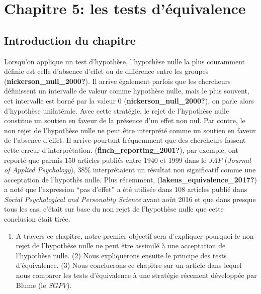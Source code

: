 \documentclass[
  english,
  man]{apa6}
\author{\phantom{0}}
\date{}
\affiliation{\phantom{0}}
\providecommand{\tightlist}{%
  \setlength{\itemsep}{0pt}\setlength{\parskip}{0pt}}
\begin{document}
\hypertarget{chapitre-5-les-tests-duxe9quivalence}{%
\section{Chapitre 5: les tests d'équivalence}\label{chapitre-5-les-tests-duxe9quivalence}}

\hypertarget{introduction-du-chapitre}{%
\subsection{Introduction du chapitre}\label{introduction-du-chapitre}}

Lorsqu'on applique un test d'hypothèse, l'hypothèse nulle la plus couramment définie est celle d'absence d'effet ou de différence entre les groupes (\textbf{nickerson\_null\_2000?}). Il arrive également parfois que les chercheurs définissent un intervalle de valeur comme hypothèse nulle, mais le plus souvent, cet intervalle est borné par la valeur 0 (\textbf{nickerson\_null\_2000?}), on parle alors d'hypothèse unilatérale. Avec cette stratégie, le rejet de l'hypothèse nulle constitue un soutien en faveur de la présence d'un effet non nul. Par contre, le non rejet de l'hypothèse nulle ne peut être interprété comme un soutien en faveur de l'absence d'effet. Il arrive pourtant fréquemment que des chercheurs fassent cette erreur d'interprétation. (\textbf{finch\_reporting\_2001?}), par exemple, ont reporté que parmis 150 articles publiés entre 1940 et 1999 dans le \emph{JAP} (\emph{Journal of Applied Psychology}), 38\% interprétaient un résultat non significatif comme une acceptation de l'hypothès nulle. Plus récemment, (\textbf{lakens\_equivalence\_2017?}) a noté que l'expression ``pas d'effet'' a été utilisée dans 108 articles publié dans \emph{Social Psychological and Personality Science} avant août 2016 et que dans presque tous les cas, c'était sur base du non rejet de l'hypothèse nulle que cette conclusion était tirée.

\begin{enumerate}
\def\labelenumi{(\arabic{enumi})}
\tightlist
\item
  A travers ce chapitre, notre premier objectif sera d'expliquer pourquoi le non-rejet de l'hypothèse nulle ne peut être assimilé à une acceptation de l'hypothèse nulle. (2) Nous expliquerons ensuite le principe des tests d'équivalence. (3) Nous concluerons ce chapitre sur un article dans lequel nous comparer les tests d'équivalence à une stratégie récement développée par Blume (le \(SGPV\)).
\end{enumerate}
\end{document}
